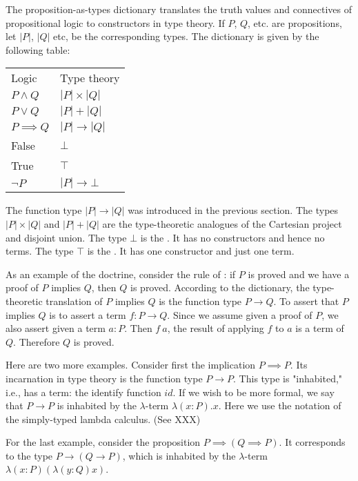 The proposition-as-types dictionary translates the truth values and connectives of propositional logic to constructors in type theory.  If $P$, $Q$, etc. are propositions, let $|P|$, $|Q|$ etc, be the corresponding types.  The dictionary 
 is given by the following table:

\begin{indent}
\begin{tabular}{ l l  }
Logic & Type theory \\
$P \wedge Q$  & $|P| \times |Q|$  \\
$P \lor Q$ &  $|P| + |Q|$ \\
$P \implies Q$ & $|P| \to |Q| $ \\
False &  $\bot$ \\
True & $\top$  \\
$ \neg P$ & $ |P| \to \bot $ \\
\end{tabular}
\end{indent}

The  function type $|P| \to |Q|$ was introduced in the previous section.  The types $|P| \times |Q|$ and $|P| + |Q|$ are the type-theoretic analogues of the Cartesian project and disjoint union.  The type  $\bot$ is the .  It has no constructors and hence no terms.  The type $\top$ is the .  It has one constructor and just one term.  



As an example of the doctrine, consider the rule of : if $P$ is proved and we have a proof of $P$ implies $Q$, then $Q$ is proved.  According to the dictionary, the type-theoretic translation of $P$ implies $Q$ is the function type $P \to Q$.  To assert that $P$ implies $Q$ is to assert a term $f : P \to Q$.  Since we assume given a proof of $P$, we also assert given a term $a : P$. Then $f\ a$, the result of applying $f$ to $a$ is a term of $Q$.  Therefore $Q$ is proved.

Here are two more examples. Consider first the implication $P \implies P$.  Its incarnation in type theory is the function type $P \to P$.  This type is "inhabited," i.e., has a term: the identify function $id$.  If we wish to be more formal, we say that $P \to P$ is inhabited by the $\lambda$-term $\lambda (x: P).x$.  Here we use the notation of the simply-typed lambda calculus. (See XXX)

For the last example, consider the proposition $P \implies (Q \implies P)$.  It corresponds to the type $P \to (Q \to P)$, which is inhabited by the $\lambda$-term $\lambda(x: P)(\lambda(y:Q)x) $.

